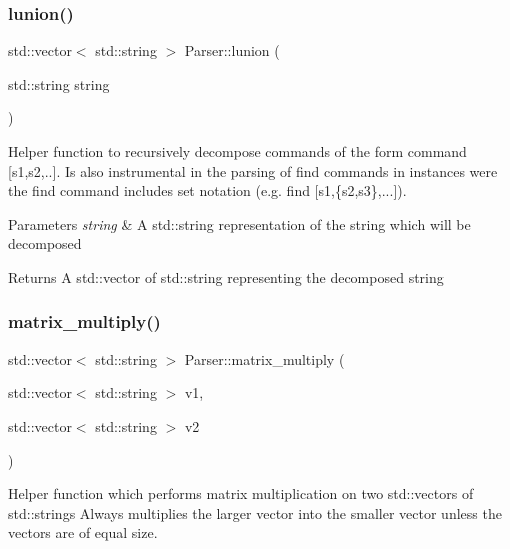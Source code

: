 \subsubsection{\texorpdfstring{lunion()}{lunion()}}
{\footnotesize\ttfamily std\+::vector$<$ std\+::string $>$ Parser\+::lunion (\begin{DoxyParamCaption}\item[{std\+::string}]{string }\end{DoxyParamCaption})\hspace{0.3cm}{\ttfamily [private]}}

Helper function to recursively decompose commands of the form \textquotesingle{}command \mbox{[}s1,s2,..\mbox{]}\textquotesingle{}. Is also instrumental in the parsing of \textquotesingle{}find\textquotesingle{} commands in instances were the find command includes set notation (e.\+g. \textquotesingle{}find \mbox{[}s1,\{s2,s3\},...\mbox{]}\textquotesingle{}).


\begin{DoxyParams}{Parameters}
{\em string} & A std\+::string representation of the string which will be decomposed\\
\hline
\end{DoxyParams}
\begin{DoxyReturn}{Returns}
A std\+::vector of std\+::string representing the decomposed string 
\end{DoxyReturn}
\mbox{\label{class_parser_ac5276b177af3258fdd2437134652f9df}} 
\subsubsection{\texorpdfstring{matrix\+\_\+multiply()}{matrix\_multiply()}}
{\footnotesize\ttfamily std\+::vector$<$ std\+::string $>$ Parser\+::matrix\+\_\+multiply (\begin{DoxyParamCaption}\item[{std\+::vector$<$ std\+::string $>$}]{v1,  }\item[{std\+::vector$<$ std\+::string $>$}]{v2 }\end{DoxyParamCaption})\hspace{0.3cm}{\ttfamily [private]}}



Helper function which performs matrix multiplication on two std\+::vector\textquotesingle{}s of std\+::string\textquotesingle{}s Always multiplies the larger vector into the smaller vector unless the vectors are of equal size. 

